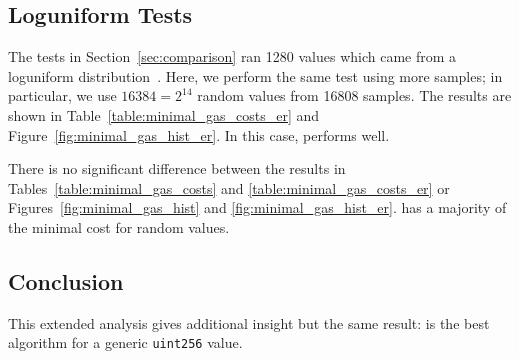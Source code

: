 \subsection{Loguniform Tests}
\label{app:loguniform}

The tests in Section~\ref{sec:comparison} ran 1280 values
which came from a loguniform distribution~\cite{ScipyLoguniform}.
Here, we perform the same test using more samples;
in particular, we use $\num{16384} = 2^{14}$ random values
from \num{16808} samples.
The results are shown in Table~\ref{table:minimal_gas_costs_er}
and Figure~\ref{fig:minimal_gas_hist_er}.
In this case, \UnrolledThree{} performs well.

There is no significant difference between the results in 
Tables~\ref{table:minimal_gas_costs} and \ref{table:minimal_gas_costs_er}
or Figures~\ref{fig:minimal_gas_hist} and \ref{fig:minimal_gas_hist_er}.
\UnrolledThree{} has a majority of the minimal cost for random values.

\begin{figure}[p]
\begin{minipage}{\textwidth}

\end{minipage}

\vspace{1cm}

\begin{minipage}{\textwidth}

\end{minipage}
\end{figure}

\subsection{Conclusion}

This extended analysis gives additional insight but the same result:
\UnrolledThree{} is the best algorithm
for a generic \texttt{uint256} value.
